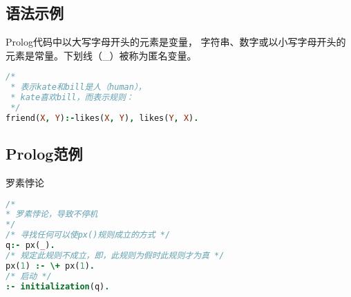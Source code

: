 \subsection*{语法示例}
Prolog代码中以大写字母开头的元素是变量，
字符串、数字或以小写字母开头的元素是常量。下划线（\_）被称为匿名变量。
\begin{lstlisting}[language=Prolog]
/* 
 * 表示kate和bill是人（human），
 * kate喜欢bill，而表示规则： 
 */
friend(X, Y):-likes(X, Y), likes(Y, X).
\end{lstlisting}

\subsection{Prolog范例}
{\bfseries\raggedright 罗素悖论\par}
\begin{lstlisting}[language=Prolog]
/*
* 罗素悖论，导致不停机
*/
/* 寻找任何可以使px()规则成立的方式 */
q:- px(_).
/* 规定此规则不成立，即，此规则为假时此规则才为真 */
px(1) :- \+ px(1). 
/* 启动 */
:- initialization(q).
\end{lstlisting}

